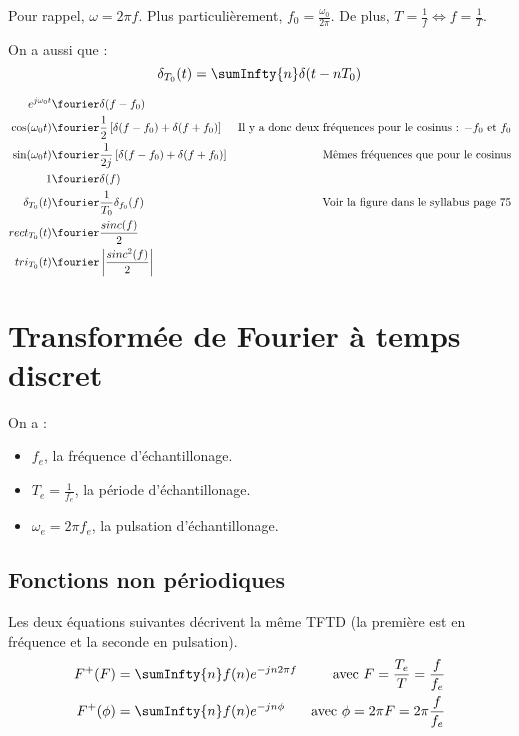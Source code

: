             \begin{remarque}
                Pour rappel, $\omega = 2\pi f$. Plus particulièrement, $f_0 = \frac{\omega_0}{2\pi}$. De plus, $T = \frac{1}{f} \Leftrightarrow f = \frac{1}{T}$.

                On a aussi que :
                $$\delta_{T_0}(t) = \sumInfty{n}\delta(t - nT_0)$$
            \end{remarque}

            \begin{align*}
                e^{j\omega_0t} &\fourier \delta(f - f_0)\\
                \cos(\omega_0t) &\fourier \frac{1}{2}\left[\delta(f - f_0) + \delta(f + f_0)\right] & \text{Il y a donc deux fréquences pour le cosinus : $-f_0$ et $f_0$}\\
                \sin(\omega_0 t) &\fourier \frac{1}{2j}\left[\delta(f - f_0) + \delta(f + f_0)\right] & \text{Mêmes fréquences que pour le cosinus}\\
                1 &\fourier \delta(f)\\
                \delta_{T_0}(t) &\fourier \frac{1}{T_0}\delta_{f_0}(f) & \text{Voir la figure dans le syllabus page 75}\\
                rect_{T_0}(t) &\fourier \frac{sinc(f)}{2}\\
                tri_{T_0}(t) &\fourier \left|\frac{sinc^2(f)}{2}\right|
            \end{align*}

\section{Transformée de Fourier à temps discret}
    On a :
    \begin{itemize}
        \item $f_e$, la fréquence d'échantillonage.
        \item $T_e = \frac{1}{f_e}$, la période d'échantillonage.
        \item $\omega_e = 2\pi f_e$, la pulsation d'échantillonage.
    \end{itemize}
    \subsection{Fonctions non périodiques}
        Les deux équations suivantes décrivent la même TFTD (la première est en fréquence et la seconde en pulsation).
        \begin{align*}
            F^+(F) &= \sumInfty{n} f(n) e^{-jn2\pi f} &\mbox{avec } F = \frac{T_e}{T} = \frac{f}{f_e}\\
            F^+(\phi) &= \sumInfty{n} f(n)e^{-jn\phi} &\mbox{avec } \phi = 2\pi F = 2\pi \frac{f}{f_e}
        \end{align*}

